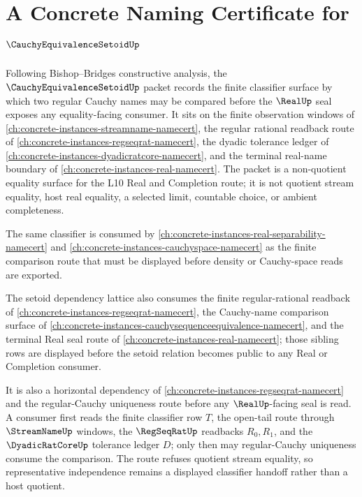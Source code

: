 \chapter{A Concrete Naming Certificate for $\CauchyEquivalenceSetoidUp$}
\label{ch:concrete-instances-cauchy-equivalence-setoid-namecert}

Following Bishop--Bridges constructive analysis, the $\CauchyEquivalenceSetoidUp$ packet records the finite classifier surface by which two regular Cauchy names may be compared before the $\RealUp$ seal exposes any equality-facing consumer. It sits on the finite observation windows of \autoref{ch:concrete-instances-streamname-namecert}, the regular rational readback route of \autoref{ch:concrete-instances-regseqrat-namecert}, the dyadic tolerance ledger of \autoref{ch:concrete-instances-dyadicratcore-namecert}, and the terminal real-name boundary of \autoref{ch:concrete-instances-real-namecert}. The packet is a non-quotient equality surface for the L10 Real and Completion route; it is not quotient stream equality, host real equality, a selected limit, countable choice, or ambient completeness.

The same classifier is consumed by \autoref{ch:concrete-instances-real-separability-namecert} and \autoref{ch:concrete-instances-cauchyspace-namecert} as the finite comparison route that must be displayed before density or Cauchy-space reads are exported.

The setoid dependency lattice also consumes the finite regular-rational readback of \autoref{ch:concrete-instances-regseqrat-namecert}, the Cauchy-name comparison surface of \autoref{ch:concrete-instances-cauchysequenceequivalence-namecert}, and the terminal Real seal route of \autoref{ch:concrete-instances-real-namecert}; those sibling rows are displayed before the setoid relation becomes public to any Real or Completion consumer.

It is also a horizontal dependency of \autoref{ch:concrete-instances-regseqrat-namecert} and the regular-Cauchy uniqueness route before any $\RealUp$-facing seal is read. A consumer first reads the finite classifier row $T$, the open-tail route through $\StreamNameUp$ windows, the $\RegSeqRatUp$ readbacks $R_0,R_1$, and the $\DyadicRatCoreUp$ tolerance ledger $D$; only then may regular-Cauchy uniqueness consume the comparison. The route refuses quotient stream equality, so representative independence remains a displayed classifier handoff rather than a host quotient.

